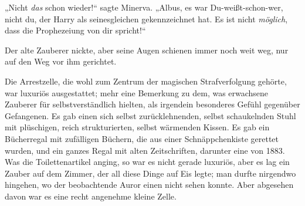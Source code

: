 „Nicht \emph{das} schon wieder!“ sagte Minerva.
„Albus, es war Du-weißt-schon-wer, nicht du, der Harry als seinesgleichen gekennzeichnet hat. Es ist nicht \emph{möglich}, dass die Prophezeiung von dir spricht!“

Der alte Zauberer nickte, aber seine Augen schienen immer noch weit weg, nur auf den Weg vor ihm gerichtet.

\later

Die Arrestzelle, die wohl zum Zentrum der magischen Strafverfolgung gehörte, war luxuriös ausgestattet; mehr eine Bemerkung zu dem, was erwachsene Zauberer für selbstverständlich hielten, als irgendein besonderes Gefühl gegenüber Gefangenen. Es gab einen sich selbst zurücklehnenden, selbst schaukelnden Stuhl mit plüschigen, reich strukturierten, selbst wärmenden Kissen. Es gab ein Bücherregal mit zufälligen Büchern, die aus einer Schnäppchenkiste gerettet wurden, und ein ganzes Regal mit alten Zeitschriften, darunter eine von 1883. Was die Toilettenartikel anging, so war es nicht gerade luxuriös, aber es lag ein Zauber auf dem Zimmer, der all diese Dinge auf Eis legte; man durfte nirgendwo hingehen, wo der beobachtende Auror einen nicht sehen konnte. Aber abgesehen davon war es eine recht angenehme kleine Zelle.
